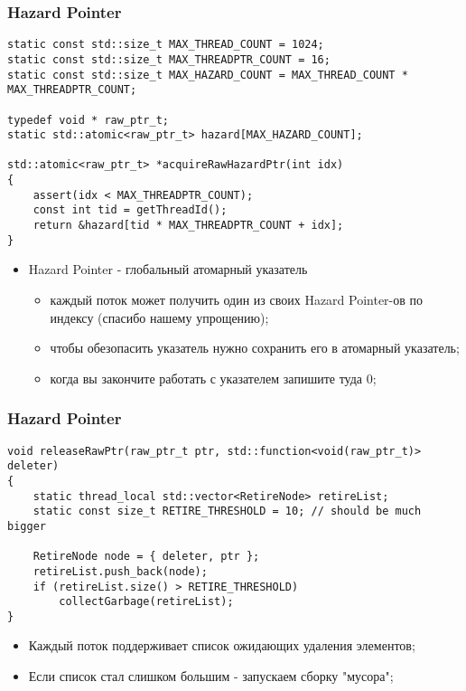 \begin{frame}[fragile]
\frametitle{Hazard Pointer}
\begin{lstlisting}
static const std::size_t MAX_THREAD_COUNT = 1024;
static const std::size_t MAX_THREADPTR_COUNT = 16;
static const std::size_t MAX_HAZARD_COUNT = MAX_THREAD_COUNT * MAX_THREADPTR_COUNT;

typedef void * raw_ptr_t;
static std::atomic<raw_ptr_t> hazard[MAX_HAZARD_COUNT];

std::atomic<raw_ptr_t> *acquireRawHazardPtr(int idx)
{
    assert(idx < MAX_THREADPTR_COUNT);
    const int tid = getThreadId();
    return &hazard[tid * MAX_THREADPTR_COUNT + idx];
}
\end{lstlisting}

\begin{itemize}
  \item Hazard Pointer - глобальный атомарный указатель
    \begin{itemize}
      \item каждый поток может получить один из своих Hazard Pointer-ов по индексу (спасибо нашему упрощению);
      \item чтобы обезопасить указатель нужно сохранить его в атомарный указатель;
      \item когда вы закончите работать с указателем запишите туда 0;
    \end{itemize}
\end{itemize}
\end{frame}

\begin{frame}[fragile]
\frametitle{Hazard Pointer}

\begin{lstlisting}
void releaseRawPtr(raw_ptr_t ptr, std::function<void(raw_ptr_t)> deleter)
{
    static thread_local std::vector<RetireNode> retireList;
    static const size_t RETIRE_THRESHOLD = 10; // should be much bigger

    RetireNode node = { deleter, ptr };
    retireList.push_back(node);
    if (retireList.size() > RETIRE_THRESHOLD)
        collectGarbage(retireList);
}
\end{lstlisting}

\begin{itemize}
  \item Каждый поток поддерживает список ожидающих удаления элементов;
  \item Если список стал слишком большим - запускаем сборку "мусора";
\end{itemize}
\end{frame}

